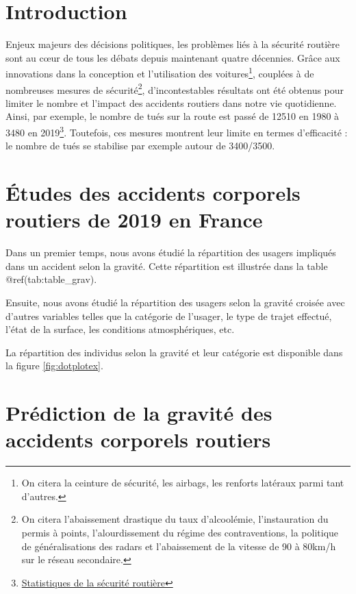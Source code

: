\documentclass[french,]{tp}
\let\rmarkdownfootnote\footnote%
\def\footnote{\protect\rmarkdownfootnote}
\begin{document}
\newpage

\hypertarget{introduction}{%
\section{Introduction}\label{introduction}}

Enjeux majeurs des décisions politiques, les problèmes liés à la sécurité routière sont au cœur de tous les débats depuis maintenant quatre décennies.
Grâce aux innovations dans la conception et l'utilisation des voitures\footnote{On citera la ceinture de sécurité, les airbags, les renforts latéraux parmi tant d'autres.}, couplées à de nombreuses mesures de sécurité\footnote{On citera l'abaissement drastique du taux d'alcoolémie, l'instauration du permis à points, l'alourdissement du régime des contraventions, la politique de généralisations des radars et l'abaissement de la vitesse de 90 à 80km/h sur le réseau secondaire.}, d'incontestables résultats ont été obtenus pour limiter le nombre et l'impact des accidents routiers dans notre vie quotidienne. Ainsi, par exemple, le nombre de tués sur la route est passé de 12510 en 1980 à 3480 en 2019\footnote{\href{http://www.securite-routiere.org/Fiches/statistiques/statfr.htm}{Statistiques de la sécurité routière}}. Toutefois, ces mesures montrent leur limite en termes d'efficacité : le nombre de tués se stabilise par exemple autour de 3400/3500.

\hypertarget{uxe9tudes-des-accidents-corporels-routiers-de-2019-en-france}{%
\section{Études des accidents corporels routiers de 2019 en France}\label{uxe9tudes-des-accidents-corporels-routiers-de-2019-en-france}}

Dans un premier temps, nous avons étudié la répartition des usagers impliqués dans un accident selon la gravité. Cette répartition est illustrée dans la table @ref(tab:table\_grav).

Ensuite, nous avons étudié la répartition des usagers selon la gravité croisée avec d'autres variables telles que la catégorie de l'usager, le type de trajet effectué, l'état de la surface, les conditions atmosphériques, etc.

La répartition des individus selon la gravité et leur catégorie est disponible dans la figure \ref{fig:dotplotex}.

\hypertarget{pruxe9diction-de-la-gravituxe9-des-accidents-corporels-routiers}{%
\section{Prédiction de la gravité des accidents corporels routiers}\label{pruxe9diction-de-la-gravituxe9-des-accidents-corporels-routiers}}
\end{document}
